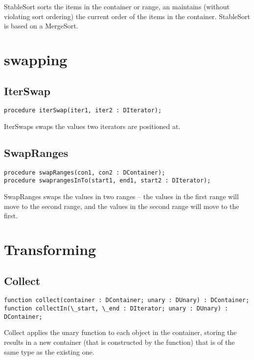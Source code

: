 \documentclass{report}
\begin{document}
StableSort sorts the items in the container or range, an maintains (without
violating sort ordering) the current order of the items in the container. 
StableSort is based on a MergeSort.

\section{swapping}

\subsection{IterSwap}

\begin{lstlisting}
procedure iterSwap(iter1, iter2 : DIterator);
\end{lstlisting}

IterSwaps swaps the values two iterators are positioned at.

\subsection{SwapRanges}

\begin{lstlisting}
procedure swapRanges(con1, con2 : DContainer);
procedure swaprangesInTo(start1, end1, start2 : DIterator);
\end{lstlisting}

SwapRanges swaps the values in two ranges -- the values in the first range
will move to the second range, and the values in the second range will move
to the first.

\section{Transforming}

\subsection{Collect}

\begin{lstlisting}
function collect(container : DContainer; unary : DUnary) : DContainer;
function collectIn(\_start, \_end : DIterator; unary : DUnary) : DContainer;
\end{lstlisting}

Collect applies the unary function to each object in the container, storing
the results in a new container (that is constructed by the function) that is
of the same type as the existing one.
\end{document}
